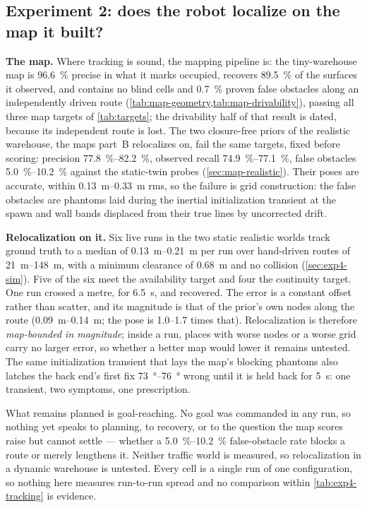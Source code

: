 \subsection{Experiment 2: does the robot localize on the map it built?}

\textbf{The map.} Where tracking is sound, the mapping pipeline is: the
tiny-warehouse map is \SI{96.6}{\percent} precise in what it marks occupied,
recovers \SI{89.5}{\percent} of the surfaces it observed, and contains no blind
cells and \SI{0.7}{\percent} proven false obstacles along an independently
driven route (\cref{tab:map-geometry,tab:map-drivability}), passing all three
map targets of \cref{tab:targets}; the drivability half of that result is
dated, because its independent route is lost. The two closure-free priors of
the realistic warehouse, the maps part~B relocalizes on, fail the same targets,
fixed before scoring: precision \SIrange{77.8}{82.2}{\percent}, observed recall
\SIrange{74.9}{77.1}{\percent}, false obstacles \SIrange{5.0}{10.2}{\percent}
against the static-twin probes (\cref{sec:map-realistic}). Their poses are
accurate, within \SIrange{0.13}{0.33}{\metre} rms, so the failure is grid
construction: the false obstacles are phantoms laid during the inertial
initialization transient at the spawn and wall bands displaced from their true
lines by uncorrected drift.

\textbf{Relocalization on it.} Six live runs in the two static realistic
worlds track ground truth to a median of \SIrange{0.13}{0.21}{\metre} per run
over hand-driven routes of \SIrange{21}{148}{\metre}, with a minimum clearance
of \SI{0.68}{\metre} and no collision (\cref{sec:exp4-sim}). Five of the six
meet the availability target and four the continuity target. One run crossed a
metre, for \SI{6.5}{\second}, and recovered. The error is a constant offset
rather than scatter, and its magnitude is that of the prior's own nodes along
the route (\SIrange{0.09}{0.14}{\metre}; the pose is \numrange{1.0}{1.7} times
that). Relocalization is therefore \emph{map-bounded in magnitude}; inside a
run, places with worse nodes or a worse grid carry no larger error, so whether
a better map would lower it remains untested. The same
initialization transient that lays the map's blocking phantoms also latches the
back end's first fix \SIrange{73}{76}{\degree} wrong until it is held back for
\SI{5}{\second}: one transient, two symptoms, one prescription.

What remains planned is goal-reaching. No goal was commanded in any run, so
nothing yet speaks to planning, to recovery, or to the question the map scores
raise but cannot settle --- whether a \SIrange{5.0}{10.2}{\percent}
false-obstacle rate blocks a route or merely lengthens it. Neither traffic
world is measured, so relocalization in a dynamic warehouse is untested. Every
cell is a single run of one configuration, so nothing here measures run-to-run
spread and no comparison within \cref{tab:exp4-tracking} is evidence.

